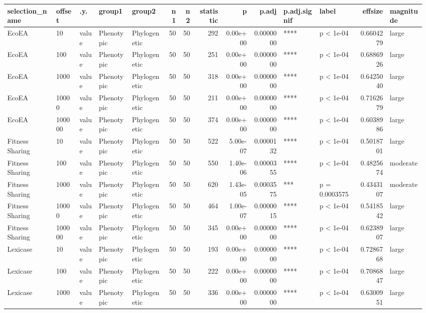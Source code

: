 \documentclass[]{book}
\begin{document}
\begin{table}
\centering
\begin{tabular}[t]{l|l|l|l|l|r|r|r|r|r|l|l|r|l}
\hline
selection\_name & offset & .y. & group1 & group2 & n1 & n2 & statistic & p & p.adj & p.adj.signif & label & effsize & magnitude\\
\hline
EcoEA & 10 & value & Phenotypic & Phylogenetic & 50 & 50 & 292 & 0.00e+00 & 0.0000000 & **** & p < 1e-04 & 0.6604279 & large\\
\hline
EcoEA & 100 & value & Phenotypic & Phylogenetic & 50 & 50 & 251 & 0.00e+00 & 0.0000000 & **** & p < 1e-04 & 0.6886926 & large\\
\hline
EcoEA & 1000 & value & Phenotypic & Phylogenetic & 50 & 50 & 318 & 0.00e+00 & 0.0000000 & **** & p < 1e-04 & 0.6425040 & large\\
\hline
EcoEA & 10000 & value & Phenotypic & Phylogenetic & 50 & 50 & 211 & 0.00e+00 & 0.0000000 & **** & p < 1e-04 & 0.7162679 & large\\
\hline
EcoEA & 100000 & value & Phenotypic & Phylogenetic & 50 & 50 & 374 & 0.00e+00 & 0.0000000 & **** & p < 1e-04 & 0.6038986 & large\\
\hline
Fitness Sharing & 10 & value & Phenotypic & Phylogenetic & 50 & 50 & 522 & 5.00e-07 & 0.0000132 & **** & p < 1e-04 & 0.5018701 & large\\
\hline
Fitness Sharing & 100 & value & Phenotypic & Phylogenetic & 50 & 50 & 550 & 1.40e-06 & 0.0000355 & **** & p < 1e-04 & 0.4825674 & moderate\\
\hline
Fitness Sharing & 1000 & value & Phenotypic & Phylogenetic & 50 & 50 & 620 & 1.43e-05 & 0.0003575 & *** & p = 0.0003575 & 0.4343107 & moderate\\
\hline
Fitness Sharing & 10000 & value & Phenotypic & Phylogenetic & 50 & 50 & 464 & 1.00e-07 & 0.0000015 & **** & p < 1e-04 & 0.5418542 & large\\
\hline
Fitness Sharing & 100000 & value & Phenotypic & Phylogenetic & 50 & 50 & 345 & 0.00e+00 & 0.0000000 & **** & p < 1e-04 & 0.6238907 & large\\
\hline
Lexicase & 10 & value & Phenotypic & Phylogenetic & 50 & 50 & 193 & 0.00e+00 & 0.0000000 & **** & p < 1e-04 & 0.7286768 & large\\
\hline
Lexicase & 100 & value & Phenotypic & Phylogenetic & 50 & 50 & 222 & 0.00e+00 & 0.0000000 & **** & p < 1e-04 & 0.7086847 & large\\
\hline
Lexicase & 1000 & value & Phenotypic & Phylogenetic & 50 & 50 & 336 & 0.00e+00 & 0.0000000 & **** & p < 1e-04 & 0.6300951 & large\\

\end{tabular}
\end{table}
\end{document}
